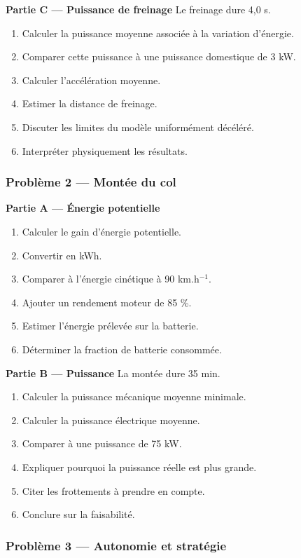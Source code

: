 \documentclass[11pt,a4paper]{article}
\begin{document}
\begin{difficile}
\textbf{Partie C — Puissance de freinage}
Le freinage dure 4,0 s.
\begin{enumerate}
  \item Calculer la puissance moyenne associée à la variation d'énergie.
  \item Comparer cette puissance à une puissance domestique de 3 kW.
  \item Calculer l'accélération moyenne.
  \item Estimer la distance de freinage.
  \item Discuter les limites du modèle uniformément décéléré.
  \item Interpréter physiquement les résultats.
\end{enumerate}

\subsubsection*{Problème 2 — Montée du col}

\textbf{Partie A — Énergie potentielle}
\begin{enumerate}
  \item Calculer le gain d'énergie potentielle.
  \item Convertir en kWh.
  \item Comparer à l'énergie cinétique à 90 km.h$^{-1}$.
  \item Ajouter un rendement moteur de 85 \%.
  \item Estimer l'énergie prélevée sur la batterie.
  \item Déterminer la fraction de batterie consommée.
\end{enumerate}

\textbf{Partie B — Puissance}
La montée dure 35 min.
\begin{enumerate}
  \item Calculer la puissance mécanique moyenne minimale.
  \item Calculer la puissance électrique moyenne.
  \item Comparer à une puissance de 75 kW.
  \item Expliquer pourquoi la puissance réelle est plus grande.
  \item Citer les frottements à prendre en compte.
  \item Conclure sur la faisabilité.
\end{enumerate}

\subsubsection*{Problème 3 — Autonomie et stratégie}


\end{difficile}
\end{document}
